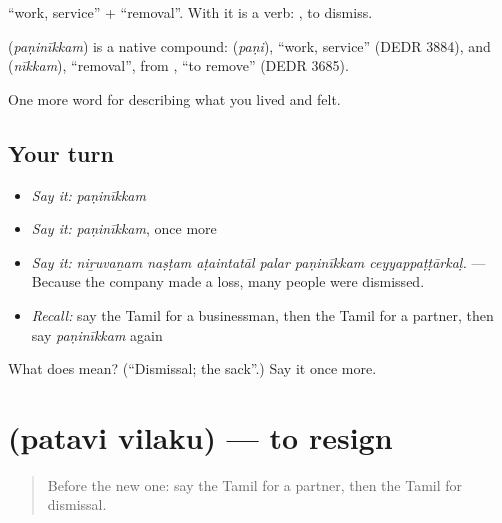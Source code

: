  \textquotedblleft{}work, service\textquotedblright{} +  \textquotedblleft{}removal\textquotedblright{}. With  it is a verb:  , to dismiss.

\begin{cousinweb}
\textbf{} (\emph{paṇinīkkam}) is a native compound:  (\emph{paṇi}), \textquotedblleft{}work, service\textquotedblright{} (DEDR 3884), and  (\emph{nīkkam}), \textquotedblleft{}removal\textquotedblright{}, from , \textquotedblleft{}to remove\textquotedblright{} (DEDR 3685).
\end{cousinweb}

\begin{grammarlens}[title={What you've built}]
One more word for describing what you lived and felt.
\end{grammarlens}

\subsection*{Your turn}
\begin{itemize}
\raggedright
  \item \emph{Say it:} \emph{paṇinīkkam}
  \item \emph{Say it:} \emph{paṇinīkkam}, once more
  \item \emph{Say it:} \emph{niṟuvaṉam naṣṭam aṭaintatāl palar paṇinīkkam ceyyappaṭṭārkaḷ.} — Because the company made a loss, many people were dismissed.
  \item \emph{Recall:} say the Tamil for a businessman, then the Tamil for a partner, then say \emph{paṇinīkkam} again
\end{itemize}

\begin{tcolorbox}[breakable,colback=teal!4,colframe=teal!35!black,title={Before you move on}]
What does  mean? (\textquotedblleft{}Dismissal; the sack\textquotedblright{}.) Say it once more.
\end{tcolorbox}
\section[\texorpdfstring{\ta{பதவி} \ta{விலகு} (patavi vilaku)}{பதவி விலகு (patavi vilaku)}]{  (patavi vilaku) — to resign}

\label{lesson:TA-C512-patavi-vilaku}



\begin{quote}
Before the new one: say the Tamil for a partner, then the Tamil for dismissal.
\end{quote}

